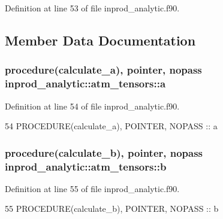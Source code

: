 Definition at line 53 of file inprod\+\_\+analytic.\+f90.



\subsection{Member Data Documentation}
\subsubsection[{\texorpdfstring{a}{a}}]{\setlength{\rightskip}{0pt plus 5cm}procedure({\bf calculate\+\_\+a}), pointer, nopass inprod\+\_\+analytic\+::atm\+\_\+tensors\+::a\hspace{0.3cm}{\ttfamily [private]}}\hypertarget{structinprod__analytic_1_1atm__tensors_abb8c2b843f31f85eadf4c183b9bbfc35}{}\label{structinprod__analytic_1_1atm__tensors_abb8c2b843f31f85eadf4c183b9bbfc35}


Definition at line 54 of file inprod\+\_\+analytic.\+f90.


\begin{DoxyCode}
54      \textcolor{keywordtype}{PROCEDURE}(calculate\_a), \textcolor{keywordtype}{POINTER}, \textcolor{keywordtype}{NOPASS} :: a
\end{DoxyCode}
\subsubsection[{\texorpdfstring{b}{b}}]{\setlength{\rightskip}{0pt plus 5cm}procedure({\bf calculate\+\_\+b}), pointer, nopass inprod\+\_\+analytic\+::atm\+\_\+tensors\+::b\hspace{0.3cm}{\ttfamily [private]}}\hypertarget{structinprod__analytic_1_1atm__tensors_a427a3462d211c39009bb85e0cfe4a59b}{}\label{structinprod__analytic_1_1atm__tensors_a427a3462d211c39009bb85e0cfe4a59b}


Definition at line 55 of file inprod\+\_\+analytic.\+f90.


\begin{DoxyCode}
55      \textcolor{keywordtype}{PROCEDURE}(calculate\_b), \textcolor{keywordtype}{POINTER}, \textcolor{keywordtype}{NOPASS} :: b
\end{DoxyCode}
